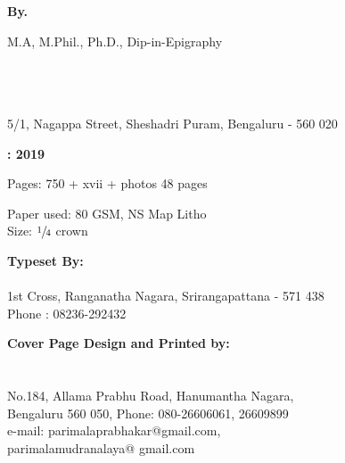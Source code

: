 \thispagestyle{empty}

\begin{center}
{\bf {}}

\bigskip

{\bf By. } 


{\fontsize{12pt}{10pt}\selectfont M.A, M.Phil., Ph.D., Dip-in-Epigraphy}


\vfil

{}\\[3pt]
{\bf{}}\\[3pt]
{\bf{}}\relax\\
5/1, Nagappa Street, Sheshadri Puram, Bengaluru - 560 020

\vfil

\textbf{: 2019}

\vfil

Pages: 750 + xvii + photos 48 pages

\vfil

Paper used:  80 GSM, NS Map Litho\\
Size:  $\sfrac{1}{4}$ crown

\vfil

{\bf {}}

\vfil

{\bf {}}

\vfil

{\bf Typeset By:}\\[4pt]
{\bf {}}\\
{1st Cross, Ranganatha Nagara, Srirangapattana - 571 438}\\
{Phone : 08236-292432}

\vfil


{\bf Cover Page Design and Printed by:}\\[4pt]
{\bf {}}\\
{\bf {}}\\
No.184, Allama Prabhu Road, Hanumantha Nagara,\\
Bengaluru 560 050, Phone: 080-26606061, 26609899\\
e-mail:  parimalaprabhakar@gmail.com,\\
parimalamudranalaya@ gmail.com
\end{center}
